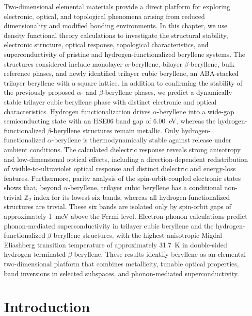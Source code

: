 Two-dimensional elemental materials provide a direct platform for exploring electronic,
optical,
and topological phenomena arising from reduced dimensionality and modified bonding environments.
In this chapter,
we use density functional theory calculations to investigate the structural stability,
electronic structure,
optical response,
topological characteristics,
and superconductivity of pristine and hydrogen-functionalized beryllene systems.
The structures considered include monolayer $\alpha$-beryllene,
bilayer $\beta$-beryllene,
bulk reference phases,
and newly identified trilayer cubic beryllene,
an ABA-stacked trilayer beryllene with a square lattice.
In addition to confirming the stability of the previously proposed $\alpha$- and $\beta$-beryllene phases,
we predict a dynamically stable trilayer cubic beryllene phase with distinct electronic and optical characteristics.
Hydrogen functionalization drives $\alpha$-beryllene into a wide-gap semiconducting state with an HSE06 band gap of \qty{6.00}{\electronvolt},
whereas the hydrogen-functionalized $\beta$-beryllene structures remain metallic.
Only hydrogen-functionalized $\alpha$-beryllene is thermodynamically stable against  release under ambient conditions.
The calculated dielectric response reveals strong anisotropy and low-dimensional optical effects,
including a direction-dependent redistribution of visible-to-ultraviolet optical response
and distinct dielectric and energy-loss features.
Furthermore,
parity analysis of the spin-orbit-coupled electronic states shows that,
beyond $\alpha$-beryllene,
trilayer cubic beryllene has a conditional non-trivial $\mathbb{Z}_2$ index for its lowest six bands,
whereas all hydrogen-functionalized structures are trivial.
These six bands are isolated only by spin-orbit gaps of approximately \qty{1}{\milli\electronvolt} above the Fermi level.
Electron-phonon calculations predict phonon-mediated superconductivity in trilayer cubic beryllene and the hydrogen-functionalized $\beta$-beryllene structures,
with the highest anisotropic Migdal--Eliashberg transition temperature of approximately \qty{31.7}{\kelvin} in double-sided hydrogen-terminated $\beta$-beryllene.
These results identify beryllene as an elemental two-dimensional platform that combines metallicity,
tunable optical properties,
band inversions in selected subspaces,
and phonon-mediated superconductivity.

\section{Introduction}
\label{3_introduction}

